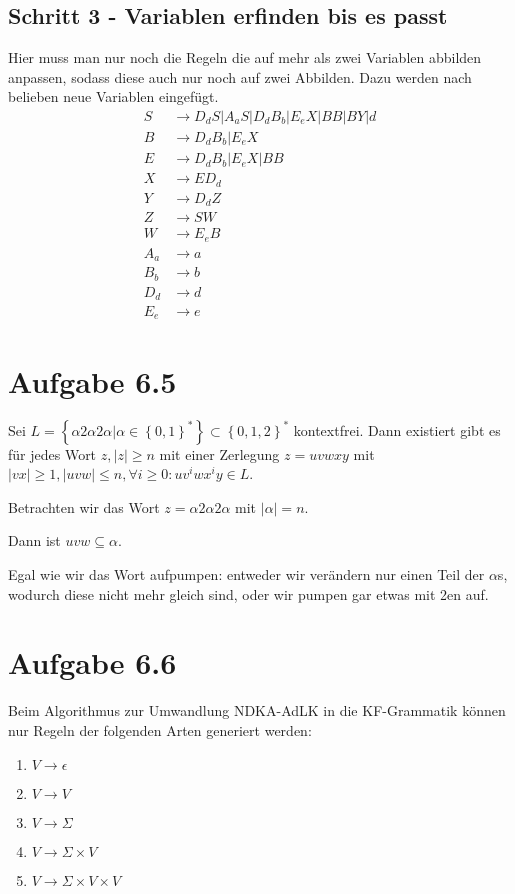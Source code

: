 \documentclass{article}
\begin{document}
\subsection*{Schritt 3 - Variablen erfinden bis es passt}
Hier muss man nur noch die Regeln die auf mehr als zwei Variablen abbilden anpassen, sodass diese auch nur noch auf zwei Abbilden. Dazu werden nach belieben neue Variablen eingefügt.
\begin{align*}
S&\rightarrow D_dS | A_aS | D_dB_b | E_eX | BB | BY | d\\
B&\rightarrow D_dB_b | E_eX\\
E&\rightarrow D_dB_b | E_eX | BB\\
X&\rightarrow ED_d \\
Y&\rightarrow D_dZ \\
Z&\rightarrow SW \\
W&\rightarrow E_eB \\
A_a&\rightarrow a\\
B_b&\rightarrow b\\
D_d&\rightarrow d\\
E_e&\rightarrow e
\end{align*}



\section*{Aufgabe 6.5}
Sei $L = \left\{\alpha 2 \alpha 2 \alpha | \alpha \in \left\{0,1\right\}^* \right\} \subset \left\{0,1,2\right\}^*$ kontextfrei. Dann existiert gibt es für jedes Wort $z, |z|\geq n$ mit einer Zerlegung $z=uvwxy$ mit $|vx|\geq 1, |uvw|\leq n, \forall i \geq 0: uv^iwx^iy \in L$.

Betrachten wir das Wort $z = \alpha 2 \alpha 2 \alpha$ mit $|\alpha|=n$.

Dann ist $uvw \subseteq \alpha$. 

Egal wie wir das Wort aufpumpen: entweder wir verändern nur einen Teil der $\alpha$s, wodurch diese nicht mehr gleich sind, oder wir pumpen gar etwas mit 2en auf.



\section*{Aufgabe 6.6}
Beim Algorithmus zur Umwandlung NDKA-AdLK in die KF-Grammatik können nur Regeln der folgenden Arten generiert werden:
\begin{enumerate}
	\item $V \rightarrow \epsilon$
  \item $V \rightarrow V$
  \item $V \rightarrow \Sigma$
  \item $V \rightarrow \Sigma \times V$
  \item $V \rightarrow \Sigma \times V \times V$
\end{enumerate}
\end{document}
